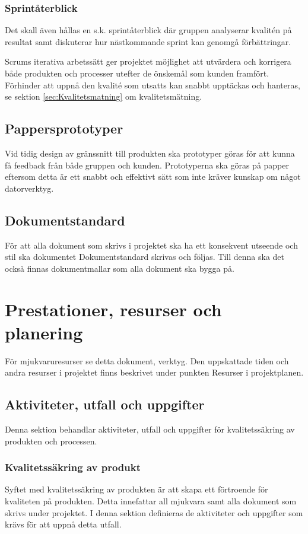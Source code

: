 \documentclass[a4paper,10pt]{article}
\begin{document}
\subsubsection{Sprintåterblick}

Det skall även hållas en s.k. sprintåterblick där gruppen analyserar kvalitén på resultat samt diskuterar hur nästkommande sprint kan genomgå förbättringar.

Scrums iterativa arbetssätt ger projektet möjlighet att utvärdera och korrigera både produkten och processer utefter de önskemål som kunden framfört. Förhinder att uppnå den kvalité som utsatts kan snabbt upptäckas och hanteras, se sektion \ref{sec:Kvalitetsmatning} om kvalitetsmätning.

\subsection{Pappersprototyper}
Vid tidig design av gränssnitt till produkten ska prototyper göras för att kunna få feedback från både gruppen och kunden. Prototyperna ska göras på papper eftersom detta är ett snabbt och effektivt sätt som inte kräver kunskap om något datorverktyg.

\subsection{Dokumentstandard}
För att alla dokument som skrivs i projektet ska ha ett konsekvent utseende och stil ska dokumentet Dokumentstandard skrivas och följas. Till denna ska det också finnas dokumentmallar som alla dokument ska bygga på.

\section{Prestationer, resurser och planering}
För mjukvaruresurser se detta dokument, verktyg. 
Den uppskattade tiden och andra resurser i projektet finns beskrivet under punkten Resurser i projektplanen. 

\subsection{Aktiviteter, utfall och uppgifter}
Denna sektion behandlar aktiviteter, utfall och uppgifter för kvalitetssäkring av produkten och processen. 
\subsubsection{Kvalitetssäkring av produkt}
Syftet med kvalitetssäkring av produkten är att skapa ett förtroende för kvaliteten på produkten. Detta innefattar all mjukvara samt alla dokument som skrivs under projektet. I denna sektion definieras de aktiviteter och uppgifter som krävs för att uppnå detta utfall.
\end{document}
